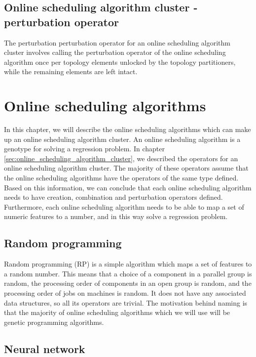 \subsection{Online scheduling algorithm cluster - perturbation operator}
The perturbation perturbation operator for an online scheduling algorithm cluster involves calling the perturbation operator of the online scheduling algorithm once per topology elements unlocked by the topology partitioners, while the remaining elements are left intact.

\section{Online scheduling algorithms}
\label{sec:online_scheduling_algorithms}

In this chapter, we will describe the online scheduling algorithms which can make up an online scheduling algorithm cluster. An online scheduling algorithm is a genotype for solving a regression problem. In chapter \ref{sec:online_scheduling_algorithm_cluster}, we described the operators for an online scheduling algorithm cluster. The majority of these operators assume that the online scheduling algorithms have the operators of the same type defined. Based on this information, we can conclude that each online scheduling algorithm needs to have creation, combination and perturbation operators defined. Furthermore, each online scheduling algorithm needs to be able to map a set of numeric features to a number, and in this way solve a regression problem.

\subsection{Random programming}

Random programming (RP) is a simple algorithm which maps a set of features to a random number. This means that a choice of a component in a parallel group is random, the processing order of components in an open group is random, and the processing order of jobs on machines is random. It does not have any associated data structures, so all its operators are trivial. The motivation behind naming is that the majority of online scheduling algorithms which we will use will be genetic programming algorithms.

\subsection{Neural network}

